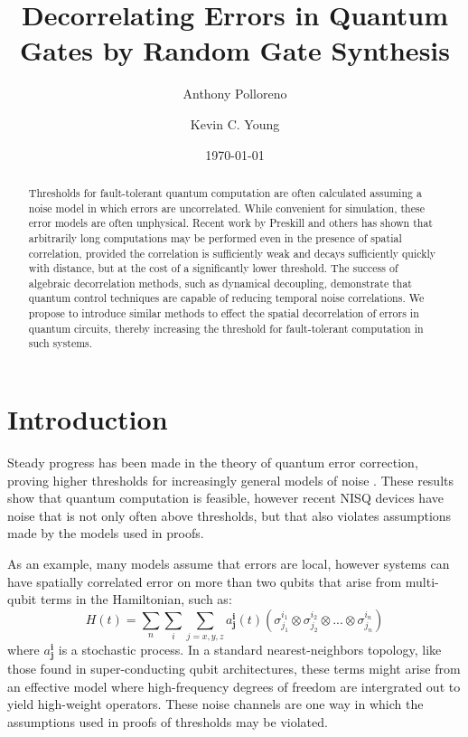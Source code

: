 \documentclass[aps,nofootinbib,pra,notitlepage,twocolumn]{revtex4-1}
\begin{document}
\title{Decorrelating Errors in Quantum Gates by Random Gate Synthesis}

\author{Anthony Polloreno}

\author{Kevin C. Young}

\date{\today}

\begin{abstract}
Thresholds for fault-tolerant quantum computation are often calculated assuming a noise model in which errors are uncorrelated. While convenient for simulation, these error models are often unphysical. Recent work by Preskill and others has shown that arbitrarily long computations may be performed even in the presence of spatial correlation, provided the correlation is sufficiently weak and decays sufficiently quickly with distance, but at the cost of a significantly lower threshold. The success of algebraic decorrelation methods, such as dynamical decoupling, demonstrate that quantum control techniques are capable of reducing temporal noise correlations. We propose to introduce similar methods to effect the spatial decorrelation of errors in quantum circuits, thereby increasing the threshold for fault-tolerant computation in such systems.
\end{abstract}

\pacs{}

\maketitle

\section{Introduction}

Steady progress has been made in the theory of quantum error correction, proving higher thresholds for increasingly general models of noise \cite{Aharonov2006}. These results show that quantum computation is feasible, however recent NISQ \cite{Preskill2018} devices have noise that is not only often above thresholds, but that also violates assumptions made by the models used in proofs.

As an example, many models assume that errors are local, however systems can have spatially correlated error on more than two qubits that arise from multi-qubit terms in the Hamiltonian, such as:
\begin{equation}\label{eq:0}
  H(t) = \sum_{n}\sum_{i}\sum_{j=x,y,z} a^{\textbf{i}}_{\textbf{j}}(t)(\sigma_{j_1}^{i_1}\otimes\sigma_{j_2}^{i_2}\otimes ... \otimes \sigma_{j_n}^{i_n})
\end{equation}
where $a^{\textbf{i}}_{\textbf{j}}$ is a stochastic process. In a standard nearest-neighbors topology, like those found in super-conducting qubit architectures, these terms might arise from an effective model where high-frequency degrees of freedom are intergrated out to yield high-weight operators. These noise channels are one way in which the assumptions used in proofs of thresholds may be violated.
\end{document}
